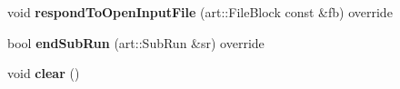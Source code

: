 \begin{DoxyCompactItemize}
\item 
\hypertarget{classlee_1_1ElectronNeutrinoFilter_a1fbb81e01455e535332fdddbd187dff4}{void {\bfseries respond\-To\-Open\-Input\-File} (art\-::\-File\-Block const \&fb) override}\label{classlee_1_1ElectronNeutrinoFilter_a1fbb81e01455e535332fdddbd187dff4}

\item 
\hypertarget{classlee_1_1ElectronNeutrinoFilter_a85815554f7381b9ececc94a83ee86859}{bool {\bfseries end\-Sub\-Run} (art\-::\-Sub\-Run \&sr) override}\label{classlee_1_1ElectronNeutrinoFilter_a85815554f7381b9ececc94a83ee86859}

\item 
\hypertarget{classlee_1_1ElectronNeutrinoFilter_aff0f9ad8cf9531ac2a743ade4758502c}{void {\bfseries clear} ()}\label{classlee_1_1ElectronNeutrinoFilter_aff0f9ad8cf9531ac2a743ade4758502c}

\end{DoxyCompactItemize}
